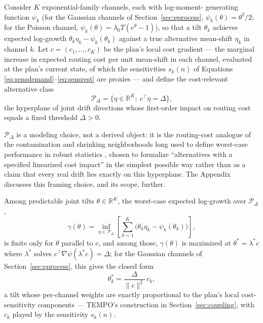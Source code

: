 \documentclass[trsc,dblanonrev]{informs4}
\begin{document}
Consider $K$ exponential-family channels, each with log-moment-
generating function $\psi_k$ (for the Gaussian channels of
Section~\ref{sec:eprocess}, $\psi_k(\theta) = \theta^2/2$; for the
Poisson channel, $\psi_k(\theta) = \lambda_0 T (e^\theta - 1)$), so that
a tilt $\theta_k$ achieves expected log-growth $\theta_k \eta_k -
\psi_k(\theta_k)$ against a true alternative mean-shift $\eta_k$ in
channel $k$. Let $c = (c_1, \dots, c_K)$ be the plan's local cost
gradient --- the marginal increase in expected routing cost per unit
mean-shift in each channel, evaluated at the plan's current state, of
which the sensitivities $s_k(n)$ of Equations
\eqref{eq:sensdemand}--\eqref{eq:sensrest} are proxies --- and define
the cost-relevant alternative class
\begin{equation}\label{eq:pdelta}
\mathcal P_\Delta = \bigl\{\eta \in \mathbb R^K :\ c^\top \eta = \Delta
\bigr\},
\end{equation}
the hyperplane of joint drift directions whose first-order impact on
routing cost equals a fixed threshold $\Delta > 0$.

$\mathcal P_\Delta$ is a modeling choice, not a derived object: it is
the routing-cost analogue of the contamination and shrinking
neighborhoods long used to define worst-case performance in robust
statistics \citep{huber1964robust}, chosen to formalize
``alternatives with a specified linearized cost impact'' in the
simplest possible way rather than as a claim that every real drift
lies exactly on this hyperplane. The Appendix discusses
this framing choice, and its scope, further.



\begin{theorem}\label{thm:growth}
Among predictable joint tilts $\theta \in \mathbb R^K$, the worst-case
expected log-growth over $\mathcal P_\Delta$,
\[
\gamma(\theta) = \inf_{\eta \in \mathcal P_\Delta} \left[\sum_{k=1}^K
\bigl(\theta_k \eta_k - \psi_k(\theta_k)\bigr)\right],
\]
is finite only for $\theta$ parallel to $c$, and among those,
$\gamma(\theta)$ is maximized at $\theta^\ast = \lambda^\ast c$ where
$\lambda^\ast$ solves $c^\top \nabla\psi(\lambda^\ast c) = \Delta$; for
the Gaussian channels of Section~\ref{sec:eprocess}, this gives the
closed form
\begin{equation}\label{eq:thetastar}
\theta_k^\ast = \frac{\Delta}{\lVert c \rVert^2}\, c_k,
\end{equation}
a tilt whose per-channel weights are exactly proportional to the
plan's local cost-sensitivity components --- TEMPO's construction in
Section~\ref{sec:coupling}, with $c_k$ played by the sensitivity
$s_k(n)$.
\end{theorem}
\end{document}
